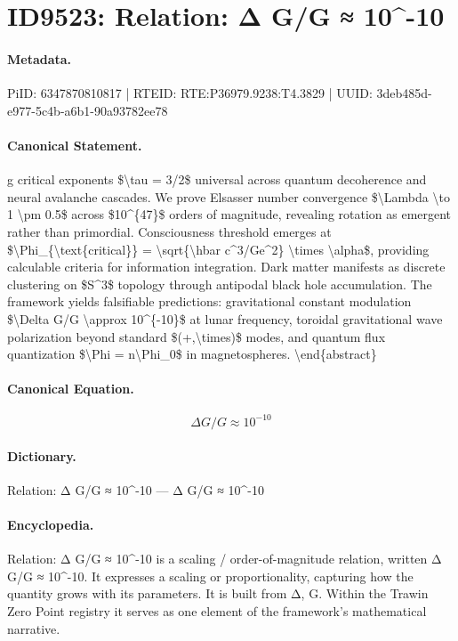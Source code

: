 \section*{ID9523: Relation: Δ G/G ≈ 10\textasciicircum{}-10}
\paragraph{Metadata.}
PiID: 6347870810817 | RTEID: RTE:P36979.9238:T4.3829 | UUID: 3deb485d-e977-5c4b-a6b1-90a93782ee78

\paragraph{Canonical Statement.}
g critical exponents \$\textbackslash{}tau = 3/2\$ universal across quantum decoherence and neural avalanche cascades. We prove Elsasser number convergence \$\textbackslash{}Lambda \textbackslash{}to 1 \textbackslash{}pm 0.5\$ across \$10\textasciicircum{}\{47\}\$ orders of magnitude, revealing rotation as emergent rather than primordial. Consciousness threshold emerges at \$\textbackslash{}Phi\_\{\textbackslash{}text\{critical\}\} = \textbackslash{}sqrt\{\textbackslash{}hbar c\textasciicircum{}3/Ge\textasciicircum{}2\} \textbackslash{}times \textbackslash{}alpha\$, providing calculable criteria for information integration. Dark matter manifests as discrete clustering on \$S\textasciicircum{}3\$ topology through antipodal black hole accumulation. The framework yields falsifiable predictions: gravitational constant modulation \$\textbackslash{}Delta G/G \textbackslash{}approx 10\textasciicircum{}\{-10\}\$ at lunar frequency, toroidal gravitational wave polarization beyond standard \$(+,\textbackslash{}times)\$ modes, and quantum flux quantization \$\textbackslash{}Phi = n\textbackslash{}Phi\_0\$ in magnetospheres. \textbackslash{}end\{abstract\}

\paragraph{Canonical Equation.}
\[
\Delta G/G \approx 10^{-10}
\]

\paragraph{Dictionary.}
Relation: Δ G/G ≈ 10\textasciicircum{}-10 — Δ G/G ≈ 10\textasciicircum{}-10

\paragraph{Encyclopedia.}
Relation: Δ G/G ≈ 10\textasciicircum{}-10 is a scaling / order-of-magnitude relation, written Δ G/G ≈ 10\textasciicircum{}-10. It expresses a scaling or proportionality, capturing how the quantity grows with its parameters. It is built from Δ, G. Within the Trawin Zero Point registry it serves as one element of the framework's mathematical narrative.
